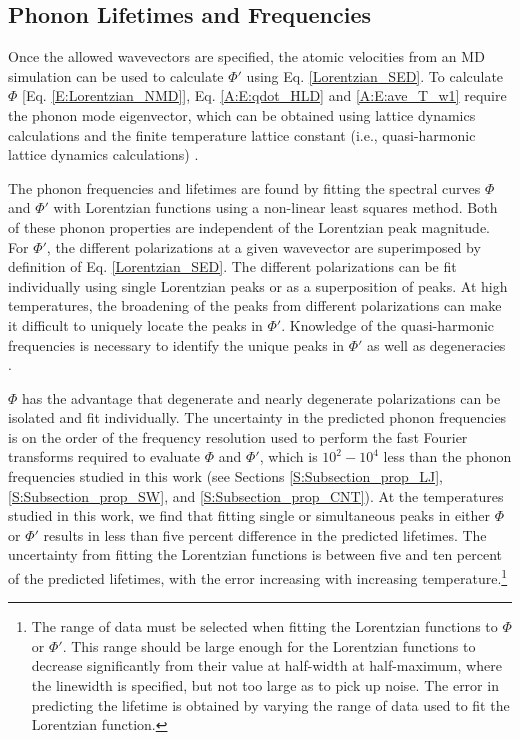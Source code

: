 \documentclass[12pt,twocolumn,iop]{/usr/share/texmf-texlive/tex/latex/iop/iopart}[/usr/share/texmf-texlive/tex/latex/iop/]
\begin{document}
\subsection{\label{Subsection_Comp_Details_2}Phonon Lifetimes and Frequencies}

Once the allowed wavevectors are specified, the atomic velocities from an MD simulation can be used to calculate $\Phi'$ using Eq$.$ \eqref{Lorentzian_SED}. To calculate $\Phi$ [Eq$.$ \eqref{E:Lorentzian_NMD}], Eq$.$ \eqref{A:E:qdot_HLD} and \eqref{A:E:ave_T_w1} require the phonon mode eigenvector, which can be obtained using lattice dynamics calculations and the finite temperature lattice constant (i.e., quasi-harmonic lattice dynamics calculations) \cite{dove1993}.

The phonon frequencies and lifetimes are found by fitting the spectral curves $\Phi$ and $\Phi'$ with Lorentzian functions using a non-linear least squares method. Both of these phonon properties are independent of the Lorentzian peak magnitude. For $\Phi'$, the different polarizations at a given wavevector are superimposed by definition of Eq$.$ \eqref{Lorentzian_SED}. The different polarizations can be fit individually using single Lorentzian peaks or as a superposition of peaks. At high temperatures, the broadening of the peaks from different polarizations can make it difficult to uniquely locate the peaks in $\Phi'$. Knowledge of the quasi-harmonic frequencies is necessary to identify the unique peaks in $\Phi'$ as well as degeneracies \cite{mcgaughey2006b,turney2009a}.

$\Phi$ has the advantage that degenerate and nearly degenerate polarizations can be isolated and fit individually. The uncertainty in the predicted phonon frequencies is on the order of the frequency resolution used to perform the fast Fourier transforms required to evaluate $\Phi$ and $\Phi'$, which is $10^2-10^4$ less than the phonon frequencies studied in this work (see Sections \ref{S:Subsection_prop_LJ}, \ref{S:Subsection_prop_SW}, and \ref{S:Subsection_prop_CNT}). At the temperatures studied in this work, we find that fitting single or simultaneous peaks in either $\Phi$ or $\Phi'$ results in less than five percent difference in the predicted lifetimes. The uncertainty from fitting the Lorentzian functions is between five and ten percent of the predicted lifetimes, with the error increasing with increasing temperature.\footnote[1]{The range of data must be selected when fitting the Lorentzian functions to $\Phi$ or $\Phi'$. This range should be large enough for the Lorentzian functions to decrease significantly from their value at
half-width at half-maximum, where the linewidth is specified, but not too large as to pick up noise. The error in predicting the lifetime is obtained by varying the range of data
used to fit the Lorentzian function.}
\end{document}
